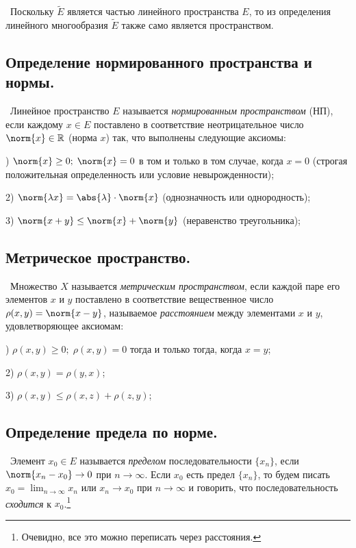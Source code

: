 \noindent \textbullet~Поскольку $\widetilde{E}$ является частью линейного пространства $E$, то из определения линейного многообразия $\widetilde{E}$ также само является пространством.


\subsection*{Определение нормированного пространства и нормы.}

\noindent \textasteriskcentered~Линейное пространство $E$ называется \textit{нормированным пространством} (НП), если каждому $x \in E$ поставлено в соответствие неотрицательное число $\norm{x} \in \mathbb{R}$ (норма $x$) так, что выполнены следующие аксиомы:

) $\norm{x} \ge 0; \; \norm{x} = 0$ в том и только в том случае, когда $x = 0$ (строгая положительная определенность или условие невырожденности);

2) $\norm{\lambda x} = \abs{\lambda} \cdot \norm{x}$ (однозначность или однородность);

3) $\norm{x + y} \le \norm{x} + \norm{y}$ (неравенство треугольника);


\subsection*{Метрическое пространство.}

\noindent \textasteriskcentered~Множество $X$ называется \textit{метрическим пространством}, если каждой паре его элементов $x$ и $y$ поставлено в соответствие вещественное число $\rho(x, y) = \norm{x - y}$, называемое \textit{расстоянием} между элементами $x$ и $y$, удовлетворяющее аксиомам:

) $\rho(x, y) \ge 0;\; \rho(x, y) = 0$ тогда и только тогда, когда $x = y$;

2) $\rho(x, y) = \rho(y, x)$;

3) $\rho(x, y) \le \rho(x, z) + \rho(z, y)$;


\subsection*{Определение предела по норме.}
\noindent \textasteriskcentered~Элемент $x_0 \in E$ называется \textit{пределом} последовательности $\{x_n\}$, если $\norm{x_n - x_0} \rightarrow 0$ при $n \rightarrow \infty$. Если $x_0$ есть предел $\{x_n\}$, то будем писать $x_0 = \lim_{n \to \infty} x_n$ или $x_n \to x_0$ при $n \to \infty$ и говорить, что последовательность \textit{сходится} к $x_0$.\footnote{Очевидно, все это можно переписать через расстояния.}


